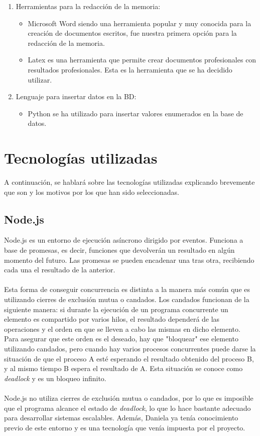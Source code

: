 \documentclass[11pt]{book}
\begin{document}
\begin{enumerate}
\begin{itemize}
	\end{itemize}
	\item Herramientas para la redacción de la memoria:
	\begin{itemize} 
		\item Microsoft Word siendo una herramienta popular y muy conocida para la creación de documentos escritos, fue nuestra primera opción para la redacción de la memoria.
		\item Latex es una herramienta que permite crear documentos profesionales con resultados profesionales. Esta es la herramienta que se ha decidido utilizar.
	\end{itemize}
	\item Lenguaje para insertar datos en la BD:
	\begin{itemize} 
		\item Python se ha utilizado para insertar valores enumerados en la base de datos.
	\end{itemize}
\end{enumerate}

\chapter{Tecnologías utilizadas}
A continuación, se hablará sobre las tecnologías utilizadas explicando brevemente que son y los motivos por los que han sido seleccionadas.

\section{Node.js} 
Node.js es un entorno de ejecución asíncrono dirigido por eventos. Funciona a base de promesas, es decir, funciones que devolverán un resultado en algún momento del futuro. Las promesas se pueden encadenar una tras otra, recibiendo cada una el resultado de la anterior.\\\\
Esta forma de conseguir concurrencia es distinta a la manera más común que es utilizando cierres de exclusión mutua o candados. Los candados funcionan de la siguiente manera: si durante la ejecución de un programa concurrente un elemento es compartido por varios hilos, el resultado dependerá de las operaciones y el orden en que se lleven a cabo las mismas en dicho elemento. Para asegurar que este orden es el deseado, hay que "bloquear" ese elemento utilizando candados, pero cuando hay varios procesos concurrentes puede darse la situación de que el proceso A esté esperando el resultado obtenido del proceso B, y al mismo tiempo B espera el resultado de A. Esta situación se conoce como \emph{deadlock} y es un bloqueo infinito.\\\\
Node.js no utiliza cierres de exclusión mutua o candados, por lo que es imposible que el programa alcance el estado de \emph{deadlock}, lo que lo hace bastante adecuado para desarrollar sistemas escalables. Además, Daniela ya tenía conocimiento previo de este entorno y es una tecnología que venía impuesta por el proyecto.
\end{document}
